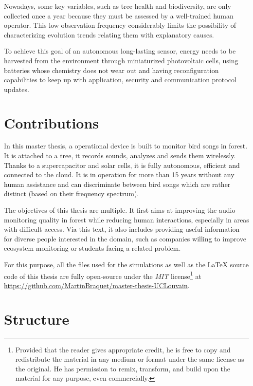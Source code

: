 \documentclass{EPL-master-thesis-covers-EN}
\begin{document}
Nowadays, some key variables, such as tree health and biodiversity, are only collected once a year because they must be assessed by a well-trained human operator. This low observation frequency considerably limits the possibility of characterizing evolution trends relating them with explanatory causes. 

To achieve this goal of an autonomous long-lasting sensor, energy needs to be harvested from the environment through miniaturized photovoltaic cells, using batteries whose chemistry does not wear out and having reconfiguration capabilities to keep up with application, security and communication protocol updates.

\section*{Contributions}

In this master thesis, a operational device is built to monitor bird songs in forest. It is attached to a tree, it records sounds, analyzes and sends them wirelessly. Thanks to a supercapacitor and solar cells, it is fully autonomous, efficient and connected to the cloud. It is in operation for more than 15 years without any human assistance and can discriminate between bird songs which are rather distinct (based on their frequency spectrum).

The objectives of this thesis are multiple. It first aims at improving the audio monitoring quality in forest while reducing human interactions, especially in areas with difficult access. Via this text, it also includes providing useful information for diverse people interested in the domain, such as companies willing to improve ecosystem monitoring or students facing a related problem.

For this purpose, all the files used for the simulations as well as the LaTeX source code of this thesis are fully open-source under the \textit{MIT} license\footnote{Provided that the reader gives appropriate credit, he is free to copy and redistribute the material in any medium or format under the same license as the original. He has permission to remix, transform, and build upon the material for any purpose, even commercially.} at \url{https://github.com/MartinBraquet/master-thesis-UCLouvain}.

\section*{Structure}
\end{document}
